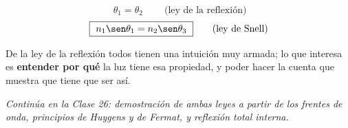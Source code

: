 \documentclass[12pt,a4paper]{article}
\begin{document}
\begin{keybox}
\[
\boxed{\ \theta_1 = \theta_2\ } \qquad \text{(ley de la reflexión)}
\]
\[
\boxed{\ n_1 \sen\theta_1 = n_2 \sen\theta_3\ } \qquad \text{(ley de Snell)}
\]
\end{keybox}

\begin{notebox}[El objetivo]
De la ley de la reflexión todos tienen una intuición muy armada; lo que interesa
es \textbf{entender por qué} la luz tiene esa propiedad, y poder hacer la cuenta
que muestra que tiene que ser así.
\end{notebox}

\vspace{1em}
\noindent\emph{Continúa en la Clase 26: demostración de ambas leyes a partir de
los frentes de onda, principios de Huygens y de Fermat, y reflexión total
interna.}
\end{document}
